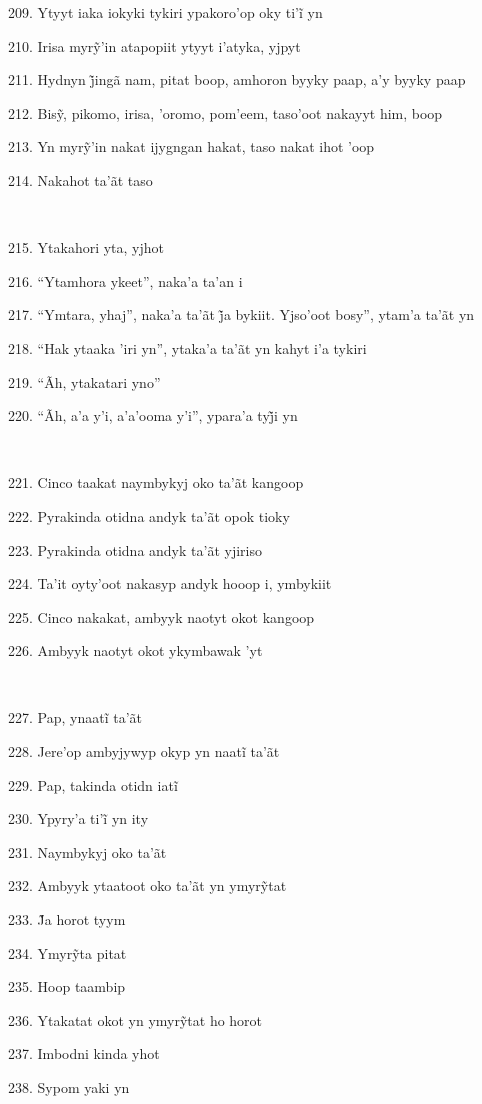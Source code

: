 209. Ytyyt iaka iokyki tykiri ypakoro’op oky ti’ĩ yn

210. Irisa myrỹ’in atapopiit ytyyt i’atyka, yjpyt

211. Hydnyn j̃ingã nam, pitat boop, amhoron byyky paap, a’y byyky paap

212. Bisỹ, pikomo, irisa, ’oromo, pom’eem, taso’oot nakayyt him, boop

213. Yn myrỹ’in nakat ijygngan hakat, taso nakat ihot ’oop

214. Nakahot ta'ãt taso

~

215. Ytakahori yta, yjhot

216. ``Ytamhora ykeet'', naka'a ta'an i

217. ``Ymtara, yhaj'', naka’a ta’ãt j̃a bykiit. Yjso’oot bosy'', ytam’a ta’ãt yn

218. ``Hak ytaaka 'iri yn'', ytaka'a ta'ãt yn kahyt i'a tykiri

219. ``Ãh, ytakatari yno''

220. ``Ãh, a’a y’i, a’a’ooma y’i'', ypara’a tyj̃i yn

~

221. Cinco taakat naymbykyj oko ta'ãt kangoop

222. Pyrakinda otidna andyk ta'ãt opok tioky

223. Pyrakinda otidna andyk ta'ãt yjiriso

224. Ta'it oyty'oot nakasyp andyk hooop i, ymbykiit

225. Cinco nakakat, ambyyk naotyt okot kangoop

226. Ambyyk naotyt okot ykymbawak 'yt

~

227. Pap, ynaatĩ ta’ãt

228. Jere’op ambyjywyp okyp yn naatĩ ta’ãt

229. Pap, takinda otidn iatĩ

230. Ypyry’a ti’ĩ yn ity

231. Naymbykyj oko ta'ãt

232. Ambyyk ytaatoot oko ta’ãt yn ymyrỹtat

233. J̃a horot tyym

234. Ymyrỹta pitat

235. Hoop taambip

236. Ytakatat okot yn ymyrỹtat ho horot

237. Imbodni kinda yhot

238. Sypom yaki yn

~

